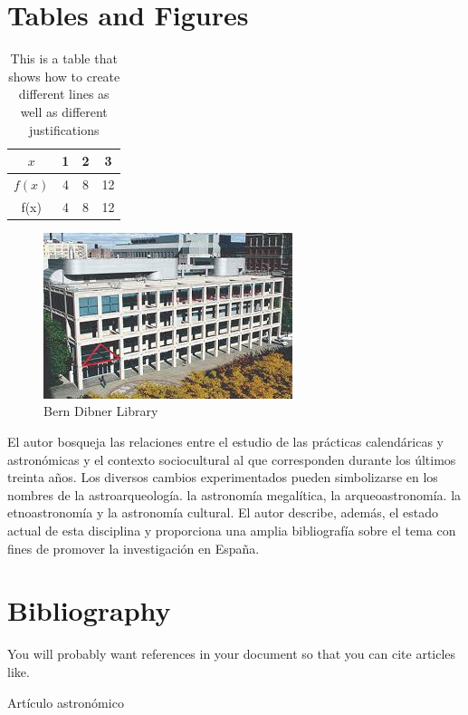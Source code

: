 \documentclass{article}
\begin{document}
\newpage
\section{Tables and Figures}
\begin{table}[H]
    \centering
    \begin{tabular}{|c||c|c|c|}
        \hline
        $x$ & 1 & 2 & 3  \\
        \hline
        $f(x)$ & 4 & 8 & 12\\
        f(x) & 4 & 8 & 12\\
        \hline
    \end{tabular}
    \caption{This is a table that shows how to create different lines as well as different justifications}
    \label{tab:my_table}
\end{table}

\begin{figure}[H]
    \centering
    \includegraphics[width=\textwidth]{bern_dibner_lib.jpeg}
    \caption{Bern Dibner Library}
    \label{fig:bern_dibner}
\end{figure}

El autor bosqueja las relaciones entre el estudio de las prácticas calendáricas y astronómicas y el contexto sociocultural al que corresponden durante los últimos treinta años. Los diversos cambios experimentados pueden simbolizarse en los nombres de la astroarqueología. la astronomía megalítica, la arqueoastronomía. la etnoastronomía y la astronomía cultural. El autor describe, además, el estado actual de esta disciplina y proporciona una amplia bibliografía sobre el tema con fines de promover la investigación en España.\cite{iwaniszewski1994astroarqueologia}

\newpage
\section{Bibliography}
You will probably want references in your document so that you can cite articles like.

\small{Artículo astronómico} \cite{cartografiasCruzConstelacion}



\end{document}

